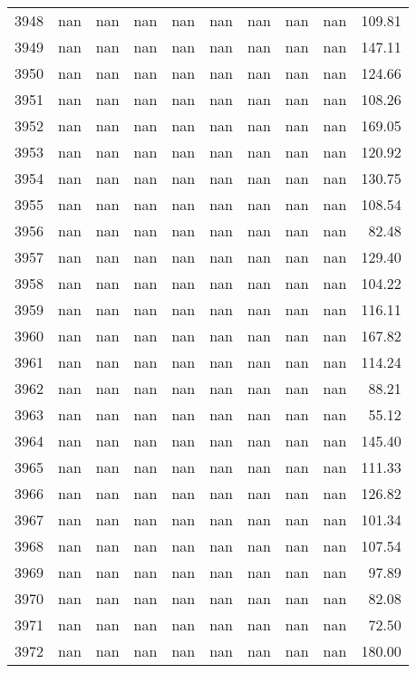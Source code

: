 \begin{tabular}{lrrrrrrrrr}
3948 & nan & nan & nan & nan & nan & nan & nan & nan & 109.81 \\
3949 & nan & nan & nan & nan & nan & nan & nan & nan & 147.11 \\
3950 & nan & nan & nan & nan & nan & nan & nan & nan & 124.66 \\
3951 & nan & nan & nan & nan & nan & nan & nan & nan & 108.26 \\
3952 & nan & nan & nan & nan & nan & nan & nan & nan & 169.05 \\
3953 & nan & nan & nan & nan & nan & nan & nan & nan & 120.92 \\
3954 & nan & nan & nan & nan & nan & nan & nan & nan & 130.75 \\
3955 & nan & nan & nan & nan & nan & nan & nan & nan & 108.54 \\
3956 & nan & nan & nan & nan & nan & nan & nan & nan & 82.48 \\
3957 & nan & nan & nan & nan & nan & nan & nan & nan & 129.40 \\
3958 & nan & nan & nan & nan & nan & nan & nan & nan & 104.22 \\
3959 & nan & nan & nan & nan & nan & nan & nan & nan & 116.11 \\
3960 & nan & nan & nan & nan & nan & nan & nan & nan & 167.82 \\
3961 & nan & nan & nan & nan & nan & nan & nan & nan & 114.24 \\
3962 & nan & nan & nan & nan & nan & nan & nan & nan & 88.21 \\
3963 & nan & nan & nan & nan & nan & nan & nan & nan & 55.12 \\
3964 & nan & nan & nan & nan & nan & nan & nan & nan & 145.40 \\
3965 & nan & nan & nan & nan & nan & nan & nan & nan & 111.33 \\
3966 & nan & nan & nan & nan & nan & nan & nan & nan & 126.82 \\
3967 & nan & nan & nan & nan & nan & nan & nan & nan & 101.34 \\
3968 & nan & nan & nan & nan & nan & nan & nan & nan & 107.54 \\
3969 & nan & nan & nan & nan & nan & nan & nan & nan & 97.89 \\
3970 & nan & nan & nan & nan & nan & nan & nan & nan & 82.08 \\
3971 & nan & nan & nan & nan & nan & nan & nan & nan & 72.50 \\
3972 & nan & nan & nan & nan & nan & nan & nan & nan & 180.00 \\

\end{tabular}
